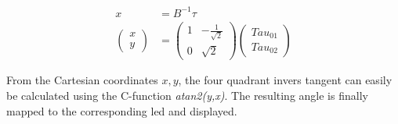 \begin{align}
	x &= B^{-1}\tau \\
	\begin{pmatrix} x \\ y \end{pmatrix}	&= \begin{pmatrix} 1 & -\frac{1}{\sqrt{2}} \\ 0 & \sqrt{2}\end{pmatrix} \begin{pmatrix} {Tau}_{01} \\ {Tau}_{02}\end{pmatrix}
\end{align}

From the Cartesian coordinates $x,y$, the four quadrant invers tangent can easily be calculated using the C-function \emph{atan2(y,x)}.
The resulting angle is finally mapped to the corresponding led and displayed.